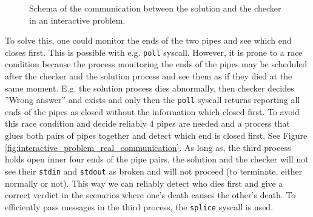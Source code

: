 \documentclass[en]{pracamgr}
\begin{document}
\begin{figure}[h]
\tikzset{>=latex} %
\centering
{}
\caption{Schema of the communication between the solution and the checker in an interactive problem.}
\label{fig:intaractive_problem_communication_schema}
\end{figure}

To solve this, one could monitor the ends of the two pipes and see which end closes first. This is possible with e.g. \texttt{poll} syscall. However, it is prone to a race condition because the process monitoring the ends of the pipes may be scheduled after the checker and the solution process and see them as if they died at the same moment. E.g. the solution process dies abnormally, then checker decides ''Wrong answer'' and exists and only then the \texttt{poll} syscall returns reporting all ends of the pipes as closed without the information which closed first. To avoid this race condition and decide reliably 4 pipes are needed and a process that glues both pairs of pipes together and detect which end is closed first. See Figure \ref{fig:interactive_problem_real_communication}. As long as, the third process holds open inner four ends of the pipe pairs, the solution and the checker will not see their \texttt{stdin} and \texttt{stdout} as broken and will not proceed (to terminate, either normally or not). This way we can reliably detect who dies first and give a correct verdict in the scenarios where one's death causes the other's death. To efficiently pass messages in the third process, the \texttt{splice} syscall is used.
\end{document}
